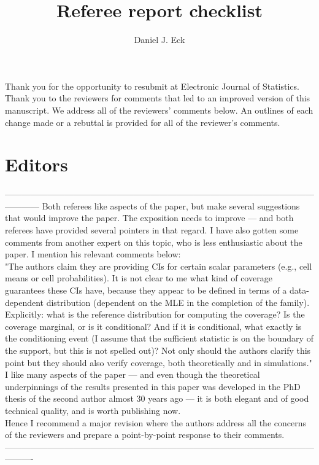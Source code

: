 \documentclass[12pt]{article}
\title{Referee report checklist}
\author{Daniel J. Eck}
\date{}
\begin{document}
\maketitle




Thank you for the opportunity to resubmit at Electronic Journal of Statistics. Thank you to the reviewers for comments that led to an improved version of this manuscript. We address all of the reviewers' comments below. An outlines of each change made or a rebuttal is provided for all of the reviewer's comments.


\section*{Editors}

------------------------------------------------------------------------------------------------------------------------
Both referees like aspects of the paper, but make several suggestions that would improve the paper. The exposition needs to improve --- and both referees have provided several pointers in that regard. I have also gotten some comments from another expert on this topic, who is less enthusiastic about the paper. I mention his relevant comments below: \\

"The authors claim they are providing CIs for certain scalar parameters (e.g., cell means or cell probabilities). It is not clear to me what kind of coverage guarantees these CIs have, because they appear to be defined in terms of a data-dependent distribution (dependent on the MLE in the completion of the family). Explicitly: what is the reference distribution for computing the coverage? Is the coverage marginal, or is it conditional? And if it is conditional, what exactly is the conditioning event (I assume that the sufficient statistic is on the boundary of the support, but this is not spelled out)? Not only should the authors clarify this point but they should also verify coverage, both theoretically and in simulations." \\

I like many aspects of the paper --- and even though the theoretical underpinnings of the results presented in this paper was developed in the PhD thesis of the second author almost 30 years ago --- it is both elegant and of good technical quality, and is worth publishing now. \\

Hence I recommend a major revision where the authors address all the concerns of the reviewers and prepare a point-by-point response to their comments.\\
----------------------------------------------------------------------------------------------------------------------
\end{document}
